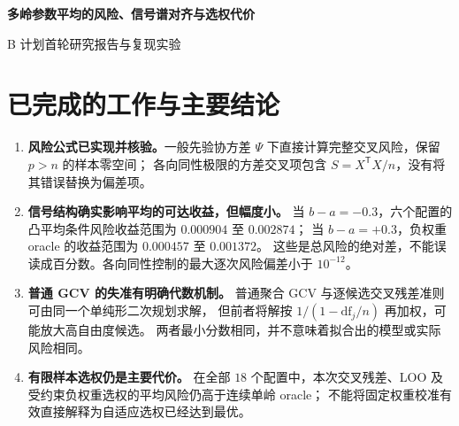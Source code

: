 \documentclass[UTF8,fontset=fandol,11pt,a4paper]{ctexart}
\begin{document}
\begin{center}
{\LARGE\bfseries 多岭参数平均的风险、信号谱对齐与选权代价\par}
\vspace{6pt}
{\large B 计划首轮研究报告与复现实验\par}
\vspace{4pt}{\small 2026 年 11 月 4 日\quad 代码、原始结果与数学证明配套交付}
\end{center}
\begin{abstract}
本研究从同一训练数据、多个正则参数的岭回归平均出发，建立一般系数先验下的精确条件风险矩阵，
给出各向同性情况下可由单参数 resolvent 差商计算的高维极限，
并区分连续单岭基准、平均家族的可达收益和训练数据选权造成的损失。
主实验包含 $18$ 个配置、每配置 $100$ 次独立重复，共 $1\,800$ 份训练数据、$21\,600$ 条方法记录；
另以 $300$ 份数据验证普通 GCV 的极限反例，以 $720$ 份数据验证有界谱下的确定性等价。
各向同性控制中，连续单岭与先验平均 oracle 混合风险一致；
弱谱方向的信号方差提高时，凸平均存在小幅结构收益；强谱方向更突出时，受约束负权重可扩大可达收益。
但本次实际选权没有实现这些 oracle 收益：校正与 LOO 显著改善普通 GCV 平均，仍未优于单岭调参。
这支持将后续问题聚焦于稳定选权，而不能宣称已提出普遍优于岭回归的新方法。
\end{abstract}

\section{已完成的工作与主要结论}
\begin{enumerate}
\item \textbf{风险公式已实现并核验。}一般先验协方差 $\Psi$ 下直接计算完整交叉风险，保留 $p>n$ 的样本零空间；
各向同性极限的方差交叉项包含 $S=X^\mathsf TX/n$，没有将其错误替换为偏差项。
\item \textbf{信号结构确实影响平均的可达收益，但幅度小。}
当 $b-a=-0.3$，六个配置的凸平均条件风险收益范围为
$0.000904$ 至 $0.002874$；
当 $b-a=+0.3$，负权重 oracle 的收益范围为
$0.000457$ 至 $0.001372$。
这些是总风险的绝对差，不能误读成百分数。各向同性控制的最大逐次风险偏差小于 $10^{-12}$。
\item \textbf{普通 GCV 的失准有明确代数机制。}
普通聚合 GCV 与逐候选交叉残差准则可由同一个单纯形二次规划求解，
但前者将解按 $1/(1-\mathrm{df}_j/n)$ 再加权，可能放大高自由度候选。
两者最小分数相同，并不意味着拟合出的模型或实际风险相同。
\item \textbf{有限样本选权仍是主要代价。}
在全部 $18$ 个配置中，本次交叉残差、LOO 及受约束负权重选权的平均风险仍高于连续单岭 oracle；
不能将固定权重校准有效直接解释为自适应选权已经达到最优。
\end{enumerate}
\end{document}
